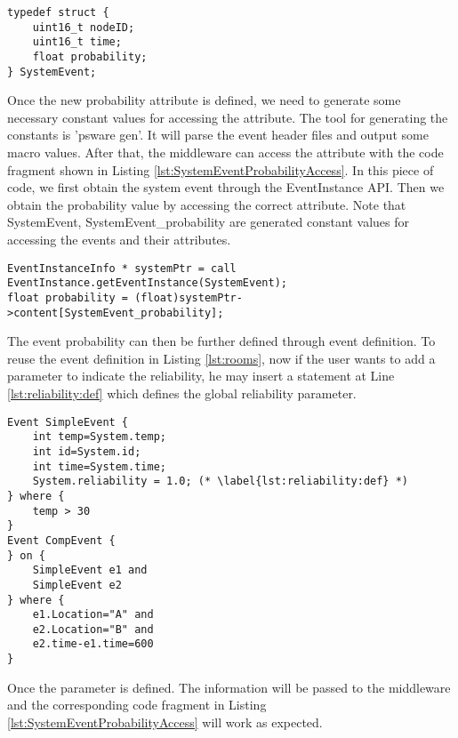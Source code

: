 \begin{lstlisting}[caption=Customized system event, label=lst:SystemEventProbability]
typedef struct {
	uint16_t nodeID;
	uint16_t time;
	float probability;
} SystemEvent;
\end{lstlisting}

Once the new probability attribute is defined, we need to generate some necessary constant values for accessing the attribute. The tool for generating the constants is 'psware gen'. It will parse the event header files and output some macro values. After that, the middleware can access the attribute with the code fragment shown in Listing \ref{lst:SystemEventProbabilityAccess}. In this piece of code, we first obtain the system event through the EventInstance API. Then we obtain the probability value by accessing the correct attribute. Note that SystemEvent, SystemEvent\_probability are generated constant values for accessing the events and their attributes.

\begin{lstlisting}[caption=Customized system event, label=lst:SystemEventProbabilityAccess]
EventInstanceInfo * systemPtr = call EventInstance.getEventInstance(SystemEvent);
float probability = (float)systemPtr->content[SystemEvent_probability];
\end{lstlisting}

The event probability can then be further defined through event definition. To reuse the event definition in Listing \ref{lst:rooms}, now if the user wants to add a parameter to indicate the reliability, he may insert a statement at Line \ref{lst:reliability:def} which defines the global reliability parameter.

\begin{lstlisting}[caption=Example of event definition with reliability, label=lst:reliability]
Event SimpleEvent {
	int temp=System.temp;
	int id=System.id;
	int time=System.time;
	System.reliability = 1.0; (* \label{lst:reliability:def} *)
} where {
	temp > 30
}
Event CompEvent {
} on {
	SimpleEvent e1 and
	SimpleEvent e2
} where {
	e1.Location="A" and
	e2.Location="B" and
	e2.time-e1.time=600
}
\end{lstlisting}

Once the parameter is defined. The information will be passed to the middleware and the corresponding code fragment in Listing \ref{lst:SystemEventProbabilityAccess} will work as expected.

